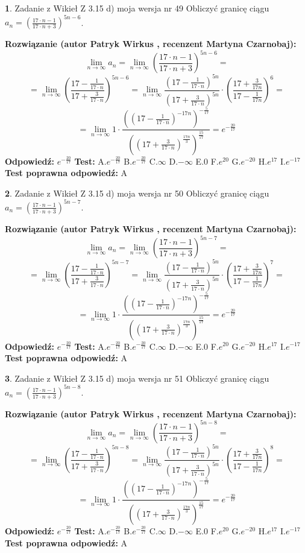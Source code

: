 \documentclass[12pt, a4paper]{article}
\theoremstyle{definition} %
\newtheorem{zad}{}
\newcommand{\zadStart}[1]{\begin{zad}#1\newline}
\newcommand{\zadStop}{\end{zad}}
\newcommand{\rozwStart}[2]{\noindent \textbf{Rozwiązanie (autor #1 , recenzent #2): }\newline}
\newcommand{\rozwStop}{\newline}
\newcommand{\odpStart}{\noindent \textbf{Odpowiedź:}\newline}
\newcommand{\odpStop}{\newline}
\newcommand{\testStart}{\noindent \textbf{Test:}\newline}
\newcommand{\testStop}{\newline}
\newcommand{\kluczStart}{\noindent \textbf{Test poprawna odpowiedź:}\newline}
\newcommand{\kluczStop}{\newline}
\begin{document}
\zadStart{Zadanie z Wikieł Z 3.15 d) moja wersja nr 49}
Obliczyć granicę ciągu $a_{n}=(\frac{17\cdot n - 1}{17 \cdot n + 3})^{5n-6}$.
\zadStop
\rozwStart{Patryk Wirkus}{Martyna Czarnobaj}
$$\lim\limits_{n\to\infty} a_{n} = \lim\limits_{n\to\infty}(\frac{17\cdot n - 1}{17 \cdot n + 3})^{5n-6}=$$
$$=\lim\limits_{n\to\infty}(\frac{17 - \frac{1}{17\cdot n}}{17 + \frac{3}{17 \cdot n}})^{5n-6}=\lim\limits_{n\to\infty}\frac{(17 - \frac{1}{17\cdot n})^{5n}}{(17 + \frac{3}{17\cdot n})^{5n}} \cdot (\frac{17+\frac{3}{17n}}{17-\frac{1}{17n}})^{6}=$$
$$=\lim\limits_{n\to\infty} 1 \cdot \frac{((17-\frac{1}{17 \cdot n})^{-17n})^{-\frac{5}{17}}}{((17+\frac{3}{17 \cdot n})^{\frac{17n}{3}})^{\frac{15}{17}}} =e^{-\frac{20}{17}}$$
\rozwStop
\odpStart
$e^{-\frac{20}{17}}$
\odpStop
\testStart
A.$ e^{-\frac{20}{17}}$
B.$ e^{-\frac{20}{17}}$
C.$\infty$
D.$-\infty$
E.$0$
F.$e^{20}$
G.$e^{-20}$
H.$e^{17}$
I.$e^{-17}$
\testStop
\kluczStart
A
\kluczStop



\zadStart{Zadanie z Wikieł Z 3.15 d) moja wersja nr 50}
Obliczyć granicę ciągu $a_{n}=(\frac{17\cdot n - 1}{17 \cdot n + 3})^{5n-7}$.
\zadStop
\rozwStart{Patryk Wirkus}{Martyna Czarnobaj}
$$\lim\limits_{n\to\infty} a_{n} = \lim\limits_{n\to\infty}(\frac{17\cdot n - 1}{17 \cdot n + 3})^{5n-7}=$$
$$=\lim\limits_{n\to\infty}(\frac{17 - \frac{1}{17\cdot n}}{17 + \frac{3}{17 \cdot n}})^{5n-7}=\lim\limits_{n\to\infty}\frac{(17 - \frac{1}{17\cdot n})^{5n}}{(17 + \frac{3}{17\cdot n})^{5n}} \cdot (\frac{17+\frac{3}{17n}}{17-\frac{1}{17n}})^{7}=$$
$$=\lim\limits_{n\to\infty} 1 \cdot \frac{((17-\frac{1}{17 \cdot n})^{-17n})^{-\frac{5}{17}}}{((17+\frac{3}{17 \cdot n})^{\frac{17n}{3}})^{\frac{15}{17}}} =e^{-\frac{20}{17}}$$
\rozwStop
\odpStart
$e^{-\frac{20}{17}}$
\odpStop
\testStart
A.$ e^{-\frac{20}{17}}$
B.$ e^{-\frac{20}{17}}$
C.$\infty$
D.$-\infty$
E.$0$
F.$e^{20}$
G.$e^{-20}$
H.$e^{17}$
I.$e^{-17}$
\testStop
\kluczStart
A
\kluczStop



\zadStart{Zadanie z Wikieł Z 3.15 d) moja wersja nr 51}
Obliczyć granicę ciągu $a_{n}=(\frac{17\cdot n - 1}{17 \cdot n + 3})^{5n-8}$.
\zadStop
\rozwStart{Patryk Wirkus}{Martyna Czarnobaj}
$$\lim\limits_{n\to\infty} a_{n} = \lim\limits_{n\to\infty}(\frac{17\cdot n - 1}{17 \cdot n + 3})^{5n-8}=$$
$$=\lim\limits_{n\to\infty}(\frac{17 - \frac{1}{17\cdot n}}{17 + \frac{3}{17 \cdot n}})^{5n-8}=\lim\limits_{n\to\infty}\frac{(17 - \frac{1}{17\cdot n})^{5n}}{(17 + \frac{3}{17\cdot n})^{5n}} \cdot (\frac{17+\frac{3}{17n}}{17-\frac{1}{17n}})^{8}=$$
$$=\lim\limits_{n\to\infty} 1 \cdot \frac{((17-\frac{1}{17 \cdot n})^{-17n})^{-\frac{5}{17}}}{((17+\frac{3}{17 \cdot n})^{\frac{17n}{3}})^{\frac{15}{17}}} =e^{-\frac{20}{17}}$$
\rozwStop
\odpStart
$e^{-\frac{20}{17}}$
\odpStop
\testStart
A.$ e^{-\frac{20}{17}}$
B.$ e^{-\frac{20}{17}}$
C.$\infty$
D.$-\infty$
E.$0$
F.$e^{20}$
G.$e^{-20}$
H.$e^{17}$
I.$e^{-17}$
\testStop
\kluczStart
A
\kluczStop
\end{document}
